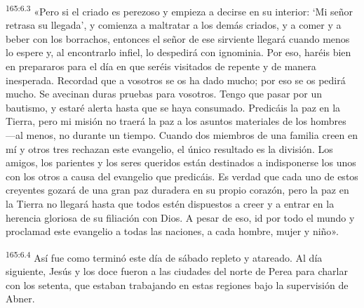 \par 
\textsuperscript{165:6.3} «Pero si el criado es perezoso y empieza a decirse en su interior: `Mi señor retrasa su llegada', y comienza a maltratar a los demás criados, y a comer y a beber con los borrachos, entonces el señor de ese sirviente llegará cuando menos lo espere y, al encontrarlo infiel, lo despedirá con ignominia. Por eso, haréis bien en prepararos para el día en que seréis visitados de repente y de manera inesperada. Recordad que a vosotros se os ha dado mucho; por eso se os pedirá mucho. Se avecinan duras pruebas para vosotros. Tengo que pasar por un bautismo, y estaré alerta hasta que se haya consumado. Predicáis la paz en la Tierra, pero mi misión no traerá la paz a los asuntos materiales de los hombres ---al menos, no durante un tiempo. Cuando dos miembros de una familia creen en mí y otros tres rechazan este evangelio, el único resultado es la división. Los amigos, los parientes y los seres queridos están destinados a indisponerse los unos con los otros a causa del evangelio que predicáis. Es verdad que cada uno de estos creyentes gozará de una gran paz duradera en su propio corazón, pero la paz en la Tierra no llegará hasta que todos estén dispuestos a creer y a entrar en la herencia gloriosa de su filiación con Dios. A pesar de eso, id por todo el mundo y proclamad este evangelio a todas las naciones, a cada hombre, mujer y niño».

\par 
\textsuperscript{165:6.4} Así fue como terminó este día de sábado repleto y atareado. Al día siguiente, Jesús y los doce fueron a las ciudades del norte de Perea para charlar con los setenta, que estaban trabajando en estas regiones bajo la supervisión de Abner.